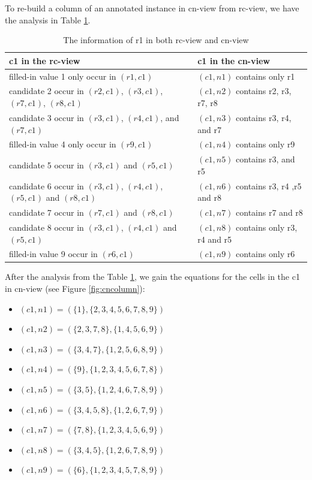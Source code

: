 \documentclass[11pt]{report}
\newcommand{\set}[1]{\{ #1 \}}
\begin{document}
To re-build a column of an annotated instance in cn-view from rc-view, we have the analysis in Table \ref{tab:rcandcn}.
\begin{table}
\begin{center}
  \begin{tabular}{|p{7cm}|p{7cm}|}
    \hline
    \textbf{c1 in the rc-view} & \textbf{c1 in the cn-view} \\ \hline
    filled-in value 1 only occur in $(r1,c1)$ & $(c1,n1)$ contains only r1\\ \hline
    candidate 2 occur in $(r2,c1)$, $(r3,c1)$, $(r7,c1)$, $(r8,c1)$ & $(c1,n2)$ contains r2, r3, r7, r8 \\ \hline
    candidate 3 occur in $(r3,c1)$,  $(r4,c1)$, and $(r7,c1)$ & $(c1,n3)$ contains r3, r4, and r7 \\ \hline
    filled-in value 4 only occur in $(r9,c1)$ & $(c1,n4)$ contains only r9 \\ \hline
    candidate 5 occur in $(r3,c1)$ and $(r5,c1)$ & $(c1,n5)$ contains r3, and r5 \\ \hline
    candidate 6 occur in $(r3,c1)$,  $(r4,c1)$, $(r5,c1)$ and $(r8,c1)$ & $(c1,n6)$ contains r3, r4 ,r5 and r8 \\ \hline
    candidate 7 occur in $(r7,c1)$ and $(r8,c1)$ & $(c1,n7)$ contains r7 and r8\\ \hline
    candidate 8 occur in $(r3,c1)$,  $(r4,c1)$ and $(r5,c1)$ & $(c1,n8)$ contains only r3, r4 and r5 \\ \hline
    filled-in value 9 occur in $(r6,c1)$ & $(c1,n9)$ contains only r6 \\ \hline
  \end{tabular}
\caption{The information of r1 in both rc-view and cn-view}
\label{tab:rcandcn}
\end{center}
\end{table}

After the analysis from the Table \ref{tab:rcandcn}, we gain the equations for the cells in the c1 in cn-view (see Figure \ref{fig:cncolumn}):
\begin{itemize}
\item $(c1,n1)=(\set{1}, \set{2, 3, 4, 5, 6, 7, 8, 9})$
\item $(c1,n2)=(\set{2, 3, 7, 8}, \set{1, 4, 5, 6, 9})$
\item $(c1,n3)=(\set{3, 4, 7}, \set{1, 2, 5, 6, 8, 9})$
\item $(c1,n4)=(\set{9}, \set{1, 2, 3, 4, 5, 6, 7, 8})$
\item $(c1,n5)=(\set{3, 5}, \set{1, 2, 4, 6, 7, 8, 9})$
\item $(c1,n6)=(\set{3, 4, 5, 8}, \set{1, 2, 6, 7, 9})$
\item $(c1,n7)=(\set{7, 8}, \set{1, 2, 3, 4, 5, 6, 9})$
\item $(c1,n8)=(\set{3, 4, 5}, \set{1, 2, 6, 7, 8, 9})$
\item $(c1,n9)=(\set{6}, \set{1, 2, 3, 4, 5, 7, 8, 9})$
\end{itemize}
\end{document}

